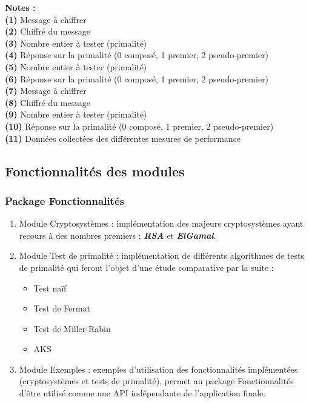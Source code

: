 		\vspace{1em}
		\hspace{-1.3em}\textbf{Notes :}\\
			\textbf{(1)} Message à chiffrer\\
			\textbf{(2)} Chiffré du message\\
			\textbf{(3)} Nombre entier à tester (primalité)\\
			\textbf{(4)} Réponse sur la primalité (0 composé, 1 premier, 2 pseudo-premier)\\
			\textbf{(5)} Nombre entier à tester (primalité)\\
			\textbf{(6)} Réponse sur la primalité (0 composé, 1 premier, 2 pseudo-premier)\\
			\textbf{(7)} Message à chiffrer\\
			\textbf{(8)} Chiffré du message\\
			\textbf{(9)} Nombre entier à tester (primalité)\\
			\textbf{(10)} Réponse sur la primalité (0 composé, 1 premier, 2 pseudo-premier)\\
			\textbf{(11)} Données collectées des différentes mesures de performance\\	
		
		
		\subsection{Fonctionnalités des modules}
			\subsubsection*{Package Fonctionnalités}
				\begin{enumerate}[leftmargin=*]
					\item Module Cryptosystèmes : implémentation des majeurs cryptosystèmes ayant recours à des nombres premiers : \textbf{\textit{RSA}} et \textbf{\textit{ElGamal}}.
					\item Module Test de primalité : implémentation de différents algorithmes de tests de primalité qui feront l'objet d'une étude comparative par la suite :
					\begin{itemize}
						\item Test naïf
						\item Test de Fermat
						\item Test de Miller-Rabin
						\item AKS
					\end{itemize}
					\item Module Exemples : exemples d'utilisation des fonctionnalités implémentées (cryptosystèmes et tests de primalité), permet au package Fonctionnalités d'être utilisé comme une API indépendante de l'application finale.
				\end{enumerate}
				

